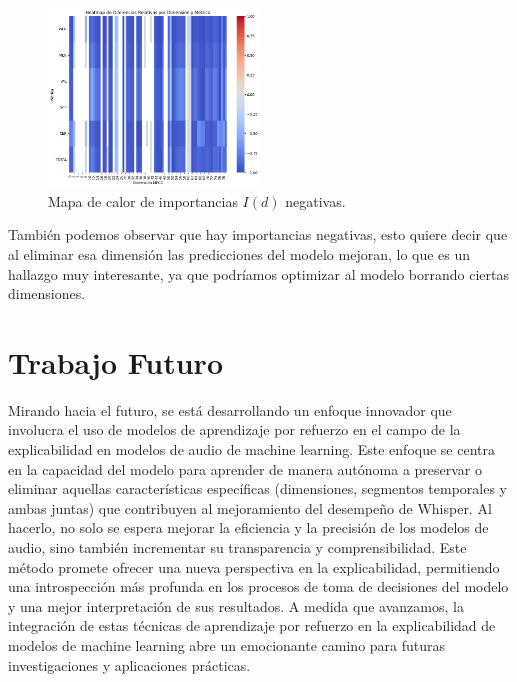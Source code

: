 \documentclass[conference]{IEEEtran}
\begin{document}
\begin{figure}[H]
\centering
\includegraphics[width=0.5\textwidth]{images/negative_importance.png}
\caption{Mapa de calor de importancias $I(d)$ negativas.}
\label{fig:cv_imp_neg}
\end{figure}

También podemos observar que hay importancias negativas, esto quiere decir que al eliminar esa dimensión las predicciones del modelo mejoran, lo que es un hallazgo muy interesante, ya que podríamos optimizar al modelo borrando ciertas dimensiones.




\section{Trabajo Futuro} \label{7-Future-Work}

Mirando hacia el futuro, se está desarrollando un enfoque innovador que involucra el uso de modelos de aprendizaje por refuerzo en el campo de la explicabilidad en modelos de audio de machine learning. Este enfoque se centra en la capacidad del modelo para aprender de manera autónoma a preservar o eliminar aquellas características específicas (dimensiones, segmentos temporales y ambas juntas) que contribuyen al mejoramiento del desempeño de Whisper. Al hacerlo, no solo se espera mejorar la eficiencia y la precisión de los modelos de audio, sino también incrementar su transparencia y comprensibilidad. Este método promete ofrecer una nueva perspectiva en la explicabilidad, permitiendo una introspección más profunda en los procesos de toma de decisiones del modelo y una mejor interpretación de sus resultados. A medida que avanzamos, la integración de estas técnicas de aprendizaje por refuerzo en la explicabilidad de modelos de machine learning abre un emocionante camino para futuras investigaciones y aplicaciones prácticas.
\end{document}
